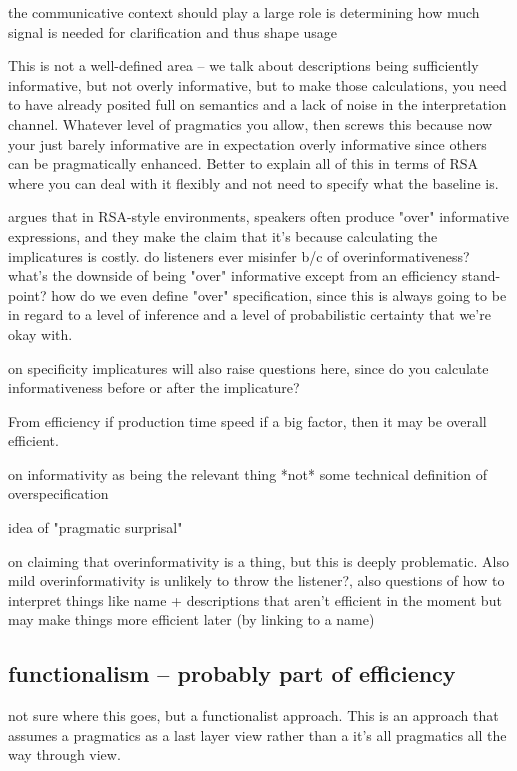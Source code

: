 \documentclass[]{article}
\begin{document}
the communicative context should play a large role is determining how much signal is needed for clarification and thus shape usage 

This is not a well-defined area -- we talk about descriptions being sufficiently informative, but not overly informative, but to make those calculations, you need to have already posited full on semantics and a lack of noise in the interpretation channel. Whatever level of pragmatics you allow, then screws this because now your just barely informative are in expectation overly informative since others can be pragmatically enhanced. Better to explain all of this in terms of RSA where you can deal with it flexibly and not need to specify what the baseline is. 

\cite{baumann2014} argues that in RSA-style environments, speakers often produce "over" informative expressions, and they make the claim that it's because calculating the implicatures is costly.  do listeners ever misinfer b/c of overinformativeness? what's the downside of being "over" informative except from an efficiency stand-point? how do we even define "over" specification, since this is always going to be in regard to a level of inference and a level of probabilistic certainty that we're okay with. 

\cite{bergen} on specificity implicatures will also raise questions here, since do you calculate informativeness before or after the implicature? 

From efficiency if production time speed if a big factor, then it may be overall efficient. 

\cite{degen20200406} on informativity as being the relevant thing *not* some technical definition of overspecification 

idea of "pragmatic surprisal" 

\cite{heller2012} on claiming that overinformativity is a thing, but this is deeply problematic. Also mild overinformativity is unlikely to throw the listener?, also questions of how to interpret things like name + descriptions that aren't efficient in the moment but may make things more efficient later (by linking to a name) 


\subsection{functionalism -- probably part of efficiency }

\cite{hawkins1995} not sure where this goes, but a functionalist approach. This is an approach that assumes a pragmatics as a last layer view rather than a it's all pragmatics all the way through view. 
\end{document}
